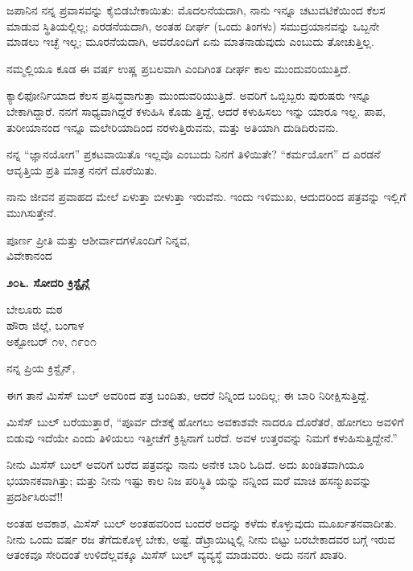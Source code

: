 ಜಪಾನಿನ ನನ್ನ ಪ್ರವಾಸವನ್ನು ಕೈಬಿಡಬೇಕಾಯಿತು: ಮೊದಲನೆಯದಾಗಿ, ನಾನು ಇನ್ನೂ ಚಟುವಟಿಕೆಯಿಂದ ಕೆಲಸ ಮಾಡುವ ಸ್ಥಿತಿಯಲ್ಲಿಲ್ಲ; ಎರಡನೆಯದಾಗಿ, ಅಂತಹ ದೀರ್ಘ (ಒಂದು ತಿಂಗಳು) ಸಮುದ್ರಯಾನವನ್ನು ಒಬ್ಬನೇ ಮಾಡಲು ಇಚ್ಛೆ ಇಲ್ಲ; ಮೂರನೆಯದಾಗಿ, ಅವರೊಂದಿಗೆ ಏನು ಮಾತನಾಡುವುದು ಎಂಬುದು ತೋಚುತ್ತಿಲ್ಲ.

ನಮ್ಮಲ್ಲಿಯೂ ಕೂಡ ಈ ವರ್ಷ ಉಷ್ಣ ಪ್ರಬಲವಾಗಿ ಎಂದಿಗಿಂತ ದೀರ್ಘ ಕಾಲ ಮುಂದುವರಿಯುತ್ತಿದೆ.

ಕ್ಯಾಲಿಫೋರ್ನಿಯಾದ ಕೆಲಸ ಪ್ರಸಿದ್ಧವಾಗುತ್ತಾ ಮುಂದುವರಿಯುತ್ತಿದೆ. ಅವರಿಗೆ ಒಬ್ಬಿಬ್ಬರು ಪುರುಷರು ಇನ್ನೂ ಬೇಕಾಗಿದ್ದಾರೆ. ನನಗೆ ಸಾಧ್ಯವಾಗಿದ್ದರೆ ಕಳುಹಿಸಿ ಕೊಡು ತ್ತಿದ್ದೆ, ಆದರೆ ಕಳುಹಿಸಲು ಇನ್ನು ಯಾರೂ ಇಲ್ಲ. ಪಾಪ, ತುರೀಯಾನಂದ ಇನ್ನೂ ಮಲೇರಿಯಾದಿಂದ ನರಳುತ್ತಿರುವನು, ಮತ್ತು ಅತಿಯಾಗಿ ದುಡಿದಿರುವನು.

ನನ್ನ “ಜ್ಞಾನಯೋಗ” ಪ್ರಕಟವಾಯಿತೊ ಇಲ್ಲವೊ ಎಂಬುದು ನಿನಗೆ ತಿಳಿಯಿತೇ? “ಕರ್ಮಯೋಗ” ದ ಎರಡನೆ ಆವೃತ್ತಿಯ ಪ್ರತಿ ಮಾತ್ರ ನನಗೆ ದೊರೆಯಿತು.

ನಾನು ಜೀವನ ಪ್ರವಾಹದ ಮೇಲೆ ಏಳುತ್ತಾ ಬೀಳುತ್ತಾ ಇರುವೆನು. ಇಂದು ಇಳಿಮುಖ, ಆದುದರಿಂದ ಪತ್ರವನ್ನು ಇಲ್ಲಿಗೆ ಮುಗಿಸುತ್ತೇನೆ.

\begin{flushright}
ಪೂರ್ಣ ಪ್ರೀತಿ ಮತ್ತು ಆಶೀರ್ವಾದಗಳೊಂದಿಗೆ ನಿನ್ನವ,\\ವಿವೇಕಾನಂದ
\end{flushright}

\begin{center}
\textbf{೨೦೬. ಸೋದರಿ ಕ್ರಿಸ್ಟೈನ್ಗೆ}
\end{center}

\begin{flushright}
ಬೇಲೂರು ಮಠ\\ಹೌರಾ ಜಿಲ್ಲೆ, ಬಂಗಾಳ\\ಅಕ್ಟೋಬರ್ ೧೪, ೧೯೦೧
\end{flushright}

ನನ್ನ ಪ್ರಿಯ ಕ್ರಿಸ್ಟೈನ್,

ಈಗ ತಾನೆ ಮಿಸೆಸ್ ಬುಲ್ ಅವರಿಂದ ಪತ್ರ ಬಂದಿತು, ಆದರೆ ನಿನ್ನಿಂದ ಬಂದಿಲ್ಲ; ಈ ಬಾರಿ ನಿರೀಕ್ಷಿಸುತ್ತಿದ್ದೆ.

ಮಿಸೆಸ್ ಬುಲ್ ಬರೆಯುತ್ತಾರೆ, “ಪೂರ್ವ ದೇಶಕ್ಕೆ ಹೋಗಲು ಅವಕಾಶವೇ ನಾದರೂ ದೊರೆತರೆ, ಹೋಗಲು ಅವಳಿಗೆ ಬಿಡುವು ಇದೆಯೇ ಎಂದು ತಿಳಿಯಲು ಇತ್ತೀಚೆಗೆ ಕ್ರಿಸ್ಟಿನಾಗೆ ಬರೆದೆ. ಅವಳ ಉತ್ತರವನ್ನು ನಿಮಗೆ ಕಳುಹಿಸುತ್ತಿದ್ದೇನೆ.”

ನೀನು ಮಿಸೆಸ್ ಬುಲ್ ಅವರಿಗೆ ಬರೆದ ಪತ್ರವನ್ನು ನಾನು ಅನೇಕ ಬಾರಿ ಓದಿದೆ. ಅದು ಖಂಡಿತವಾಗಿಯೂ ಭಯಾನಕವಾಗಿತ್ತು; ಮತ್ತು ನೀನು ಇಷ್ಟು ಕಾಲ ನಿಜ ಪರಿಸ್ಥಿತಿ ಯನ್ನು ನನ್ನಿಂದ ಮರೆ ಮಾಚಿ ಹಸನ್ಮುಖವನ್ನು ಪ್ರದರ್ಶಿಸಿರುವೆ!!

ಅಂತಹ ಅವಕಾಶ, ಮಿಸೆಸ್ ಬುಲ್ ಅಂತಹವರಿಂದ ಬಂದರೆ ಅದನ್ನು ಕಳೆದು ಕೊಳ್ಳುವುದು ಮೂರ್ಖತನವಾದೀತು. ನೀನು ಒಂದು ವರ್ಷ ರಜ ತೆಗೆದುಕೊಳ್ಳ ಬೇಕು, ಅಷ್ಟೆ. ಡೆಟ್ರಾಯಿಟ್ನಲ್ಲಿ ನೀನು ಬಿಟ್ಟು ಬರಬೇಕಾದವರ ಬಗ್ಗೆ ಇರುವ ಆತಂಕವೂ ಸೇರಿದಂತೆ ಉಳಿದೆಲ್ಲವಕ್ಕೂ ಮಿಸೆಸ್ ಬುಲ್ ವ್ಯವ್ಯಸ್ಥೆ ಮಾಡುವರು. ಅದು ನನಗೆ ಖಾತರಿ.

